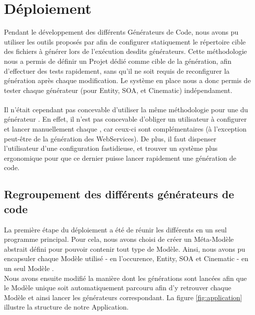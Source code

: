 \section{Déploiement}

Pendant le développement des différents Générateurs de Code, nous avons pu utiliser les outils proposés par \kweclipse afin de configurer statiquement le répertoire cible des fichiers à générer lors de l'exécution desdits générateurs. Cette méthodologie nous a permis de définir un Projet \kwplay dédié comme cible de la génération, afin d'effectuer des tests rapidement, sans qu'il ne soit requis de reconfigurer la génération après chaque modification. Le système en place nous a donc permis de tester chaque générateur (pour Entity, SOA, et Cinematic) indépendament.
\\\\
Il n'était cependant pas concevable d'utiliser la même méthodologie pour une  du générateur \kwplay. En effet, il n'est pas concevable d'obliger un utilisateur à configurer et lancer manuellement chaque , car ceux-ci sont complémentaires (à l'exception peut-être de la génération des WebServices). De plus, il faut dispenser l'utilisateur d'une configuration fastidieuse, et trouver un système plus ergonomique pour que ce dernier puisse lancer rapidement une génération de code.

\subsection{Regroupement des différents générateurs de code}

La première étape du déploiement a été de réunir les différents  en un seul programme principal. Pour cela, nous avons choisi de créer un Méta-Modèle abstrait défini pour pouvoir contenir tout type de Modèle. Ainsi, nous avons pu encapsuler chaque Modèle utilisé - en l'occurence, Entity, SOA et Cinematic - en un seul Modèle .
\\
Nous avons ensuite modifié la manière dont les générations sont lancées afin que le Modèle unique soit automatiquement parcouru afin d'y retrouver chaque Modèle et ainsi lancer les générateurs correspondant. La figure \ref{fig:application} illustre la structure de notre Application.

